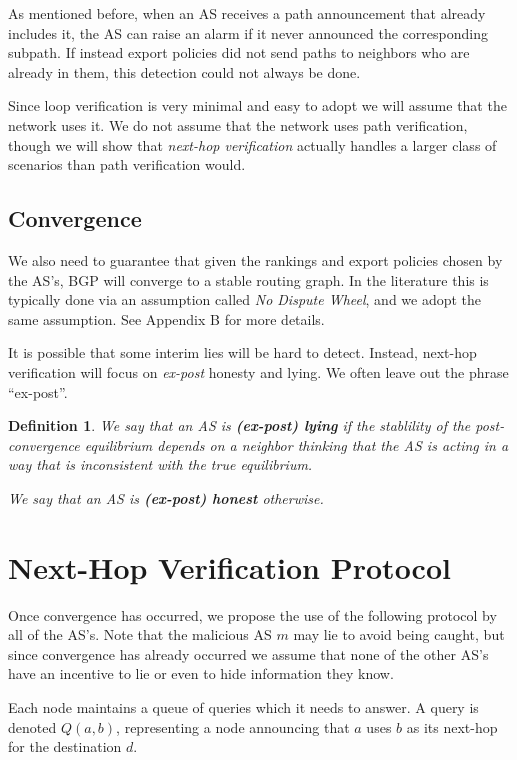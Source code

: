 \documentclass[12pt]{article}
\newtheorem{definition}{Definition}
\begin{document}
As mentioned before, when an AS receives a path announcement that already includes it, the AS can raise an alarm if it never announced the corresponding subpath. If instead export policies did not send paths to neighbors who are already in them, this detection could not always be done.

Since loop verification is very minimal and easy to adopt we will assume that the network uses it. We do not assume that the network uses path verification, though we will show that \emph{next-hop verification} actually handles a larger class of scenarios than path verification would.

\subsection{Convergence}
We also need to guarantee that given the rankings and export policies chosen by the AS's, BGP will converge to a stable routing graph. In the literature this is typically done via an assumption called \emph{No Dispute Wheel}, and we adopt the same assumption. See Appendix B for more details.

It is possible that some interim lies will be hard to detect. Instead, next-hop verification will focus on \emph{ex-post} honesty and lying. We often leave out the phrase ``ex-post''.

\begin{definition}
We say that an AS is \textbf{(ex-post) lying} if the stablility of the post-convergence equilibrium depends on a neighbor thinking that the AS is acting in a way that is inconsistent with the true equilibrium.

We say that an AS is \textbf{(ex-post) honest} otherwise.
\end{definition}


\section{Next-Hop Verification Protocol}
Once convergence has occurred, we propose the use of the following protocol by all of the AS's. Note that the malicious AS $m$ may lie to avoid being caught, but since convergence has already occurred we assume that none of the other AS's have an incentive to lie or even to hide information they know.

  Each node maintains a queue of queries which it needs to answer.
  A query is denoted $Q(a,b)$, representing a node announcing that
  $a$ uses $b$ as its next-hop for the destination $d$.
\end{document}
